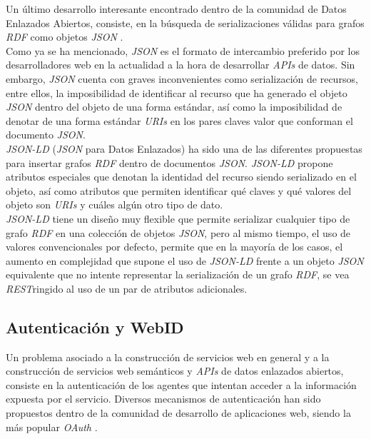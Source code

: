 Un \'ultimo desarrollo interesante encontrado dentro de la comunidad de Datos Enlazados Abiertos, consiste, en la b\'usqueda de serializaciones v\'alidas para grafos \textit{RDF} como objetos \textit{JSON} \cite{json}.\\
Como ya se ha mencionado, \textit{JSON} es el formato de intercambio preferido por los desarrolladores web en la actualidad a la hora de desarrollar \textit{APIs} de datos. Sin embargo, \textit{JSON} cuenta con graves inconvenientes como serializaci\'on de recursos, entre ellos, la imposibilidad de identificar al recurso que ha generado el objeto \textit{JSON} dentro del objeto de una forma est\'andar, as\'i como la imposibilidad de denotar de una forma est\'andar \textit{URIs} en los pares claves valor que conforman el documento \textit{JSON}.\\
\textit{JSON-LD} (\textit{JSON} para Datos Enlazados) \cite{jsonld} ha sido una de las diferentes propuestas \cite{alexander2008rdf} para insertar grafos \textit{RDF} dentro de documentos \textit{JSON}. \textit{JSON-LD} propone atributos especiales que denotan la identidad del recurso siendo serializado en el objeto, as\'i como atributos que permiten identificar qu\'e claves y qu\'e valores del objeto son \textit{URIs} y cu\'ales alg\'un otro tipo de dato.\\
\textit{JSON-LD} tiene un dise\~no muy flexible que permite serializar cualquier tipo de grafo \textit{RDF} en una colecci\'on de objetos \textit{JSON}, pero al mismo tiempo, el uso de valores convencionales por defecto, permite que en la mayor\'ia de los casos, el aumento en complejidad que supone el uso de \textit{JSON-LD} frente a un objeto \textit{JSON} equivalente que no intente representar la serializaci\'on de un grafo \textit{RDF}, se vea \textit{REST}ringido al uso de un par de atributos adicionales.\\

\subsection{Autenticaci\'on y WebID}

Un problema asociado a la construcci\'on de servicios web en general y a la construcci\'on de servicios web sem\'anticos y \textit{APIs} de datos enlazados abiertos, consiste en la autenticaci\'on de los agentes que intentan acceder a la informaci\'on expuesta por el servicio.
Diversos mecanismos de autenticaci\'on han sido propuestos dentro de la comunidad de desarrollo de aplicaciones web, siendo la m\'as popular \textit{OAuth} \cite{hammer2010oauth}.

